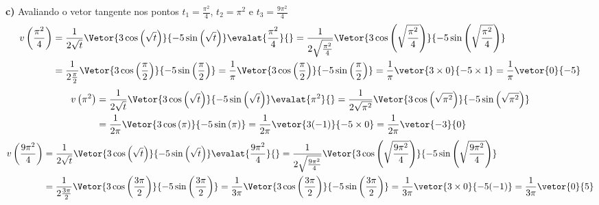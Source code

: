 \documentclass[a4paper,12pt,fleqn]{article}
\begin{document}
\begin{answer}
\bigskip
\textbf{c)} \quad
Avaliando o vetor tangente nos pontos
$t_1 = \frac{\pi^2}{4}$, $t_2 = \pi^2$ e $t_3 = \frac{9\pi^2}{4}$
\begin{align*}
  v\left(\frac{\pi^2}{4}\right)
  & = \frac{1}{2\sqrt{t}}\Vetor%
      { 3\cos\left(\sqrt{t}\right)}
      {-5\sin\left(\sqrt{t}\right)}
      \evalat{\frac{\pi^2}{4}}{}
  = \frac{1}{2\sqrt{\frac{\pi^2}{4}}}\Vetor%
      { 3\cos\left(\sqrt{\frac{\pi^2}{4}}\right)}
      {-5\sin\left(\sqrt{\frac{\pi^2}{4}}\right)}
  \\
  & = \frac{1}{2\frac{\pi}{2}}\Vetor%
      { 3\cos\left(\frac{\pi}{2}\right)}
      {-5\sin\left(\frac{\pi}{2}\right)}
  = \frac{1}{\pi}\Vetor%
      { 3\cos\left(\frac{\pi}{2}\right)}
      {-5\sin\left(\frac{\pi}{2}\right)}
  = \frac{1}{\pi}\vetor%
      { 3\times 0}
      {-5\times 1}
  = \frac{1}{\pi}\vetor%
      { 0}
      {-5}
\end{align*}
\begin{align*}
  v\left(\pi^2\right)
  & = \frac{1}{2\sqrt{t}}\Vetor%
      { 3\cos\left(\sqrt{t}\right)}
      {-5\sin\left(\sqrt{t}\right)}
      \evalat{\pi^2}{}
  = \frac{1}{2\sqrt{\pi^2}}\Vetor%
      { 3\cos\left(\sqrt{\pi^2}\right)}
      {-5\sin\left(\sqrt{\pi^2}\right)}
  \\
  & = \frac{1}{2\pi}\Vetor%
      { 3\cos\left(\pi\right)}
      {-5\sin\left(\pi\right)}
  = \frac{1}{2\pi}\vetor%
      { 3(-1)}
      {-5\times 0}
  = \frac{1}{2\pi}\vetor%
      {-3}
      {0}
\end{align*}
\begin{align*}
  v\left(\frac{9\pi^2}{4}\right)
  & = \frac{1}{2\sqrt{t}}\Vetor%
      { 3\cos\left(\sqrt{t}\right)}
      {-5\sin\left(\sqrt{t}\right)}
      \evalat{\frac{9\pi^2}{4}}{}
  = \frac{1}{2\sqrt{\frac{9\pi^2}{4}}}\Vetor%
      { 3\cos\left(\sqrt{\frac{9\pi^2}{4}}\right)}
      {-5\sin\left(\sqrt{\frac{9\pi^2}{4}}\right)}
  \\
  & = \frac{1}{2\frac{3\pi}{2}}\Vetor%
      { 3\cos\left(\frac{3\pi}{2}\right)}
      {-5\sin\left(\frac{3\pi}{2}\right)}
  = \frac{1}{3\pi}\Vetor%
      { 3\cos\left(\frac{3\pi}{2}\right)}
      {-5\sin\left(\frac{3\pi}{2}\right)}
  = \frac{1}{3\pi}\vetor%
      { 3\times 0}
      {-5(-1)}
  = \frac{1}{3\pi}\vetor%
      {0}
      {5}
\end{align*}
\end{answer}
\end{document}
